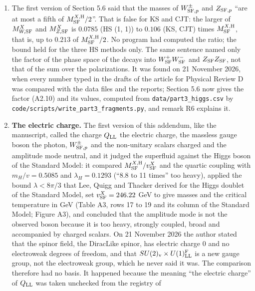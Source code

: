 \documentclass[
  10pt,
]{article}
\providecommand{\tightlist}{%
  \setlength{\itemsep}{0pt}\setlength{\parskip}{0pt}}
\begin{document}
\begin{enumerate}
\def\labelenumi{\arabic{enumi}.}
\tightlist
\item
  The first version of Section 5.6 said that the masses of
  \(W^\pm_{{\rm SF},p}\) and \(Z_{{\rm SF},p}\) ``are at most a fifth of
  \(M^{X,{\rm H}}_{\rm SF}/2\)''. That is false for KS and CJT: the
  larger of \(M^X_{W,{\rm SF}}\) and \(M^X_{Z,{\rm SF}}\) is \(0.0785\)
  (HS (1, 1)) to \(0.106\) (KS, CJT) times \(M^{X,{\rm H}}_{\rm SF}\),
  that is, up to \(0.213\) of \(M^{X,{\rm H}}_{\rm SF}/2\). No program
  had computed the ratio; the bound held for the three HS methods only.
  The same sentence named only the factor of the phase space of the
  decays into \(W^+_{\rm SF}W^-_{\rm SF}\) and \(Z_{\rm SF}Z_{\rm SF}\),
  not that of the sum over the polarizations. It was found on 21
  November 2026, when every number typed in the drafts of the article
  for Physical Review D was compared with the data files and the
  reports; Section 5.6 now gives the factor (A2.10) and its values,
  computed from \texttt{data/part3\_higgs.csv} by
  \texttt{code/scripts/write\_part3\_fragments.py}, and remark R6
  explains it.
\item
  \textbf{The electric charge.} The first version of this addendum, like
  the manuscript, called the charge \(Q_{\rm LL}\) the electric charge,
  the massless gauge boson the photon, \(W^\pm_{{\rm SF},p}\) and the
  non-unitary scalars charged and the amplitude mode neutral, and it
  judged the superfluid against the Higgs boson of the Standard Model:
  it compared \(M^{X,{\rm H}}_{\rm SF}/v^X_{\rm SF}\) and the quartic
  coupling with \(m_H/v=0.5085\) and \(\lambda_H=0.1293\) (``8.8 to 11
  times'' too heavy), applied the bound \(\lambda<8\pi/3\) that Lee,
  Quigg and Thacker derived for the Higgs doublet of the Standard Model,
  set \(v^X_{\rm SF}=246.22\) GeV to give masses and the critical
  temperature in GeV (Table A3, rows 17 to 19 and its column of the
  Standard Model; Figure A3), and concluded that the amplitude mode is
  not the observed boson because it is too heavy, strongly coupled,
  broad and accompanied by charged scalars. On 21 November 2026 the
  author stated that the spinor field, the DiracLike spinor, has
  electric charge 0 and no electroweak degrees of freedom, and that
  \(SU(2)_{\rm v}\times U(1)^{\rm F}_{\rm LL}\) is a new gauge group,
  not the electroweak group, which he never said it was. The comparison
  therefore had no basis. It happened because the meaning ``the electric
  charge'' of \(Q_{\rm LL}\) was taken unchecked from the registry of

\end{enumerate}
\end{document}
